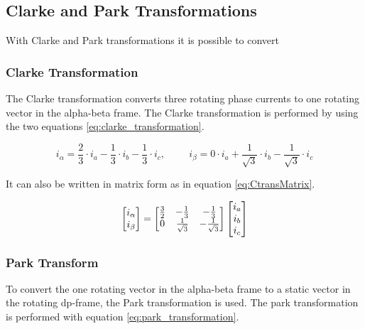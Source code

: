
\subsection{Clarke and Park Transformations}
With Clarke and Park transformations it is possible to convert 



\subsubsection{Clarke Transformation}
The Clarke transformation converts three rotating phase currents to one rotating vector in the alpha-beta frame. The Clarke transformation is performed by using the two equations \ref{eq:clarke_transformation}.

\begin{equation}
    i_{\alpha} = \frac{2}{3} \cdot i_a - \frac{1}{3} \cdot i_b - \frac{1}{3} \cdot i_c
    , \hspace{1cm}
    i_{\beta} = 0 \cdot i_a + \frac{1}{\sqrt{3}} \cdot i_b - \frac{1}{\sqrt{3}} \cdot i_c
    \label{eq:clarke_transformation}
\end{equation}

It can also be written in matrix form as in equation \ref{eq:CtransMatrix}. 

\begin{equation}
    \centering
    \begin{bmatrix}
        i_{\alpha} \\ 
        i_{\beta}
    \end{bmatrix}
    =
    \begin{bmatrix}
        \frac{3}{2} & -\frac{1}{3} & -\frac{1}{3} \\
        0 & \frac{1}{\sqrt{3}} & -\frac{1}{\sqrt{3}} \\
    \end{bmatrix}
    \begin{bmatrix}
        i_{a} \\ 
        i_{b} \\ 
        i_{c}
    \end{bmatrix}
    \label{eq:CtransMatrix}
\end{equation}


\subsubsection{Park Transform}
To convert the one rotating vector in the alpha-beta frame to a static vector in the rotating dp-frame, the Park transformation is used. The park transformation is performed with equation \ref{eq:park_transformation}.

